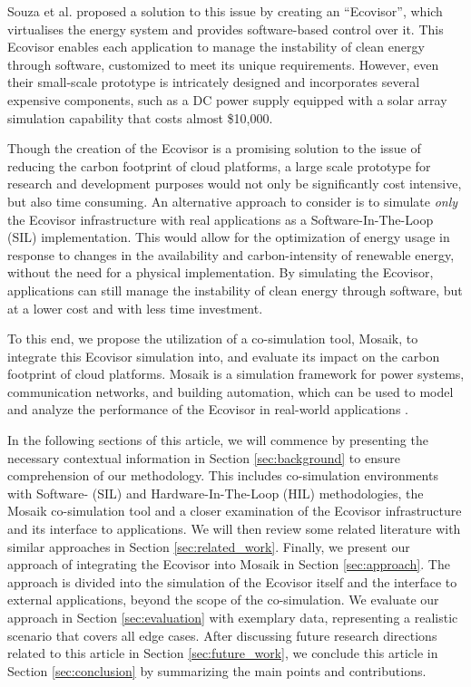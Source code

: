 Souza et al. \cite{souza2023} proposed a solution to this issue by creating an
\enquote{Ecovisor}, which virtualises the energy system and provides
software-based control over it. This Ecovisor enables each application to manage
the instability of clean energy through software, customized to meet its unique
requirements. However, even their small-scale prototype is intricately designed
and incorporates several expensive components, such as a DC power supply
equipped with a solar array simulation capability that costs almost \$10,000.

Though the creation of the Ecovisor is a promising solution to the issue of
reducing the carbon footprint of cloud platforms, a large scale prototype for
research and development purposes would not only be significantly cost
intensive, but also time consuming. An alternative approach to consider is to
simulate \emph{only} the Ecovisor infrastructure with real applications as a
Software-In-The-Loop (SIL) implementation. This would allow for the optimization
of energy usage in response to changes in the availability and carbon-intensity
of renewable energy, without the need for a physical implementation. By
simulating the Ecovisor, applications can still manage the instability of clean
energy through software, but at a lower cost and with less time investment.

To this end, we propose the utilization of a co-simulation tool, Mosaik, to
integrate this Ecovisor simulation into, and evaluate its impact on the carbon
footprint of cloud platforms. Mosaik is a simulation framework for power
systems, communication networks, and building automation, which can be used to
model and analyze the performance of the Ecovisor in real-world applications
\cite{steinbrink2019}. \medskip

In the following sections of this article, we will commence by presenting the
necessary contextual information in Section \ref{sec:background} to ensure
comprehension of our methodology. This includes co-simulation environments with
Software- (SIL) and Hardware-In-The-Loop (HIL) methodologies, the Mosaik
co-simulation tool and a closer examination of the Ecovisor infrastructure and
its interface to applications. We will then review some related literature with
similar approaches in Section \ref{sec:related_work}. Finally, we present our
approach of integrating the Ecovisor into Mosaik in Section \ref{sec:approach}.
The approach is divided into the simulation of the Ecovisor itself and the
interface to external applications, beyond the scope of the co-simulation. We
evaluate our approach in Section \ref{sec:evaluation} with exemplary data,
representing a realistic scenario that covers all edge cases. After discussing
future research directions related to this article in Section
\ref{sec:future_work}, we conclude this article in Section \ref{sec:conclusion}
by summarizing the main points and contributions.
